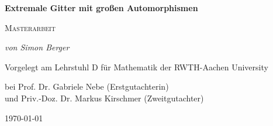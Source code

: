 \documentclass[12pt,a4paper,halfparskip,headsepline,bibtotocnumbered]{scrreprt}
\theoremstyle{nummermitklammern}
\theoremstyle{nonumberbreak}
\begin{document}

\begin{titlepage}
	\centering
	\vspace*{2cm}
	{\Large\bfseries Extremale Gitter mit großen Automorphismen\par}
	\vspace{1cm}
	{\scshape\Large Masterarbeit\par}
	\vspace{2cm}
	{\Large\itshape von Simon Berger\par}
	\vfill
	Vorgelegt am Lehrstuhl D für Mathematik der RWTH-Aachen University\par 
	bei Prof. Dr. Gabriele Nebe (Erstgutachterin)\\ 
	und Priv.-Doz. Dr. Markus Kirschmer (Zweitgutachter)\par
	\vfill

	{\large \today\par}
\end{titlepage}


\tableofcontents

\end{document}

